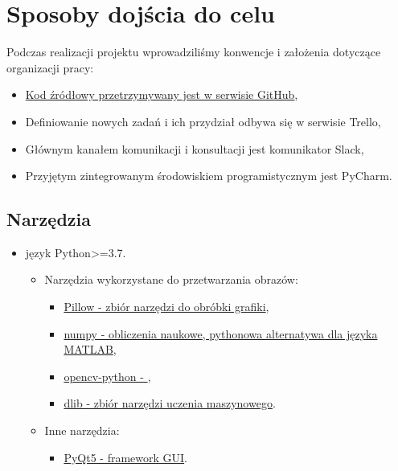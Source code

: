 \section{Sposoby dojścia do celu}
Podczas realizacji projektu wprowadziliśmy konwencje i założenia dotyczące organizacji pracy:
\begin{itemize}
    \item \href{https://github.com/majabojarska/RiPO_proj}{Kod źródłowy przetrzymywany jest w serwisie GitHub},
    \item Definiowanie nowych zadań i ich przydział odbywa się w serwisie Trello,
    \item Głównym kanałem komunikacji i konsultacji jest komunikator Slack,
    \item Przyjętym zintegrowanym środowiskiem programistycznym jest PyCharm.
\end{itemize}

\subsection{Narzędzia}

\renewcommand\labelitemii{$\bullet$}
\renewcommand\labelitemiii{$\bullet$}

\begin{itemize}
    \item język Python>=3.7.
    \begin{itemize}
        \item Narzędzia wykorzystane do przetwarzania obrazów:
        \begin{itemize}     
            \item \href{https://pillow.readthedocs.io/en/stable/}{Pillow - zbiór narzędzi do obróbki grafiki}\cite{pillow},
            \item \href{https://numpy.org/}{numpy - obliczenia naukowe, pythonowa alternatywa dla języka MATLAB}\cite{numpy},
            \item \href{https://pypi.org/project/opencv-python/}{opencv-python - }\cite{opencv-python},
            \item \href{http://dlib.net/}{dlib - zbiór narzędzi uczenia maszynowego}\cite{dlib}.
        \end{itemize}   
        \item Inne narzędzia:
        \begin{itemize}
            \item \href{https://pypi.org/project/PyQt5/}{PyQt5 - framework GUI}\cite{pyqt5}.
        \end{itemize}
    \end{itemize}
\end{itemize}

